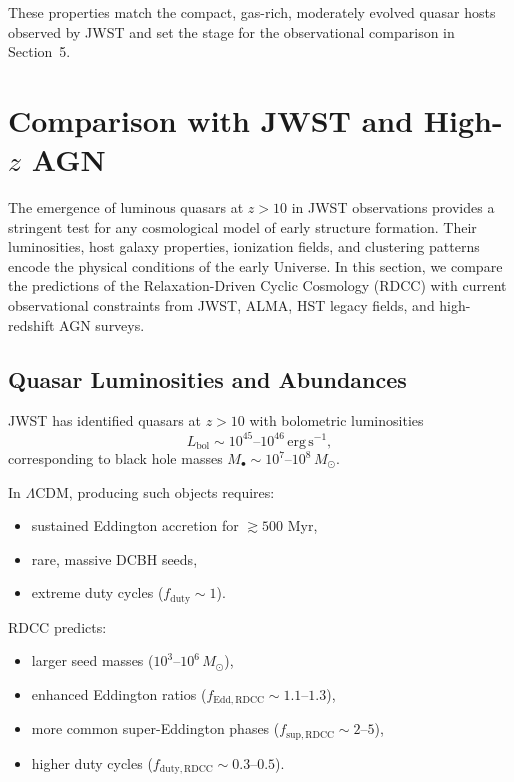 \documentclass[11pt,a4paper]{article}
\begin{document}
These properties match the compact, gas-rich, moderately evolved quasar hosts observed by
JWST and set the stage for the observational comparison in Section~5.

\section{Comparison with JWST and High-\texorpdfstring{$z$}{z} AGN}

The emergence of luminous quasars at $z > 10$ in JWST observations provides a stringent
test for any cosmological model of early structure formation. Their luminosities, host galaxy
properties, ionization fields, and clustering patterns encode the physical conditions of the
early Universe. In this section, we compare the predictions of the Relaxation-Driven Cyclic
Cosmology (RDCC) with current observational constraints from JWST, ALMA, HST legacy
fields, and high-redshift AGN surveys.

\subsection{Quasar Luminosities and Abundances}

JWST has identified quasars at $z > 10$ with bolometric luminosities
\begin{equation}
L_{\mathrm{bol}}
\sim
10^{45}\text{--}10^{46}\,\mathrm{erg\,s^{-1}},
\end{equation}
corresponding to black hole masses
$M_{\bullet} \sim 10^{7}$–$10^{8}\,M_{\odot}$.

In $\Lambda$CDM, producing such objects requires:
\begin{itemize}
\item sustained Eddington accretion for $\gtrsim 500$ Myr,
\item rare, massive DCBH seeds,
\item extreme duty cycles ($f_{\mathrm{duty}} \sim 1$).
\end{itemize}

RDCC predicts:
\begin{itemize}
\item larger seed masses ($10^{3}$–$10^{6}\,M_{\odot}$),
\item enhanced Eddington ratios ($f_{\mathrm{Edd,RDCC}} \sim 1.1$–$1.3$),
\item more common super-Eddington phases ($f_{\mathrm{sup,RDCC}} \sim 2$–$5$),
\item higher duty cycles ($f_{\mathrm{duty,RDCC}} \sim 0.3$–$0.5$).
\end{itemize}
\end{document}
